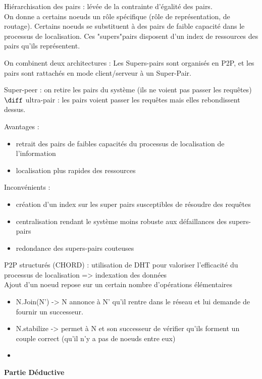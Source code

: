 {Hiérarchisation des pairs : lévée de la contrainte d'égalité des pairs.\\
On donne a certains noeuds un rôle spécifique (rôle de représentation, de routage). Certains noeuds se substituent à des pairs de faible capacité dans le processus de localisation. Ces "supers"pairs disposent d'un index de ressources des pairs qu'ils représentent.

On combinent deux architectures : Les Supers-pairs sont organisés en P2P, et les pairs sont rattachés en mode client/serveur à un Super-Pair.

Super-peer : on retire les pairs du système (ils ne voient pas passer les requêtes) $\diff$ ultra-pair : les pairs voient passer les requêtes mais elles rebondissent dessus.

Avantages :
\begin{itemize}
	\item retrait des pairs de faibles capacités du processus de localisation de l'information
	\item localisation plus rapides des ressources
\end{itemize}

Inconvénients :
\begin{itemize}
	\item création d'un index sur les super pairs susceptibles de résoudre des requêtes
	\item centralisation rendant le système moins robuste aux défaillances des supers-pairs
	\item redondance des supers-pairs couteuses
\end{itemize}


P2P structurés (CHORD) : utilisation de DHT pour valoriser l'efficacité du processus de localisation => indexation des données\\

Ajout d'un noeud repose sur un certain nombre d'opérations élémentaires

\begin{itemize}
	\item N.Join(N') -> N annonce à N' qu'il rentre dans le réseau et lui demande de fournir un successeur.
	\item N.stabilize -> permet à N et son successeur de vérifier qu'ils forment un couple correct (qu'il n'y a pas de noeuds entre eux)
	\item
\end{itemize}

\newpage
\textbf{Partie Déductive}

}
